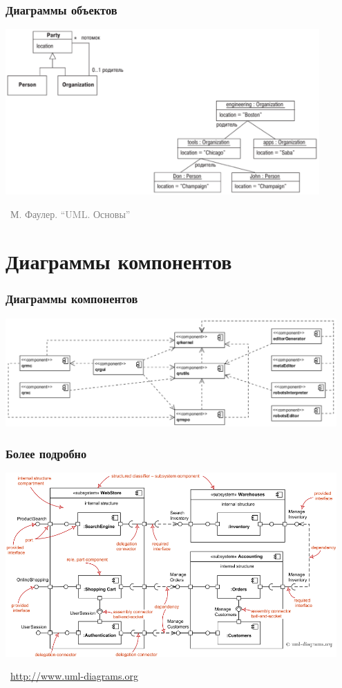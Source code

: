 \documentclass[xetex,mathserif,serif]{beamer}
\newcommand{\attribution}[1] {
	\vspace{-5mm}\begin{flushright}\begin{scriptsize}\textcolor{gray}{\textcopyright\, #1}\end{scriptsize}\end{flushright}
}
\begin{document}
	\begin{frame}
		\frametitle{Диаграммы объектов}
		\begin{center}
			\includegraphics[width=0.9\textwidth]{objectDiagrams.png}
			\attribution{М. Фаулер. ``UML. Основы''}
		\end{center}
	\end{frame}

	\section{Диаграммы компонентов}
	
	\begin{frame}
		\frametitle{Диаграммы компонентов}
		\begin{center}
			\includegraphics[width=0.95\textwidth]{componentDiagrams.png}
		\end{center}
	\end{frame}

	\begin{frame}
		\frametitle{Более подробно}
		\begin{center}
			\includegraphics[width=0.95\textwidth]{componentDiagramsOverview.png}
			\attribution{\url{http://www.uml-diagrams.org}}
		\end{center}
	\end{frame}
\end{document}
